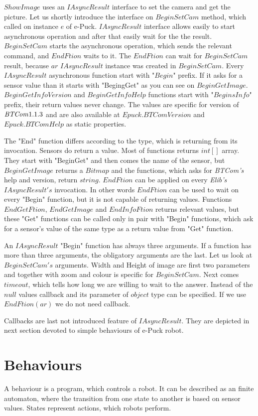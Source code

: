 	$ShowImage$ uses an $IAsyncResult$ interface to set the camera and get the picture.
	Let us shortly introduce the interface on $BeginSetCam$ method, which called on instance $e$ of e-Puck.
	$IAsyncResult$ interface allows easily to start asynchronous operation and after that easily wait for the the result.
	$BeginSetCam$ starts the asynchronous operation, which sends the relevant command, and $EndFtion$ waits to it.
	The $EndFtion$ can wait for $BeginSetCam$ result, because $ar$ $IAsyncResult$ instance was created in $BeginSetCam$.
	Every $IAsyncResult$ asynchronous function start with "$Begin$" prefix. 
	If it asks for a sensor value than it starts with "BegingGet" as you can see on $BeginGetImage$.
	$BeginGetInfoVersion$ and $BeginGetInfoHelp$ functions start with "$BeginsInfo$" prefix, their return values never change. 
	The values are specific for version of ${\it BTCom} 1.1.3$ and
	are also available at $Epuck.BTComVersion$ and $Epuck.BTComHelp$ as static properties.

	The "End" function differs according to the type, which is returning from its invocation.
	Sensors do  return a value. Most of functions returns $int[]$ array. They start with "BeginGet" 
	and then comes the name of the sensor, 	but $BeginGetImage$ returns a $Bitmap$ and the functions,
	which asks for {\it BTCom's} help and version, return $string$.
	$EndFtion$ can be applied on every {\it Elib's} $IAsyncResult's$ invocation. 
	In other words $EndFtion$ can be used to wait on every "Begin" function, but
	it is not capable of returning values. Functions $EndGetFtion$, $EndGetImage$ and $EndInfoFtion$ returns relevant values, but
	these "Get" functions can be called only in pair with "Begin" functions, which ask for a sensor's value 
	of the same type as a return value from "Get" function.

	An $IAsyncResult$ "Begin" function has always three arguments. If a function has more than three arguments, the obligatory arguments are the last.
	Let us look at $BeginSetCam's$ arguments. Width and Height of image are first two parameters 
	and together with zoom and colour is specific for $BeginSetCam$.
	Next comes $timeout$, which tells how long we are willing to wait to the answer. 
	Instead of the $null$ values callback and its parameter of $object$ type can be specified.
	If we use $EndFtion(ar)$ we do not need callback.

	Callbacks are last not introduced feature of $IAsyncResult$. They are depicted in next section devoted to simple behaviours of e-Puck robot.
\section{Behaviours} \label{behaviours}
	A behaviour is a program, which controls a robot. It can be described as an finite automaton, 
	where the transition from one state to another is based on sensor values.
	States represent actions, which robots perform.
	
